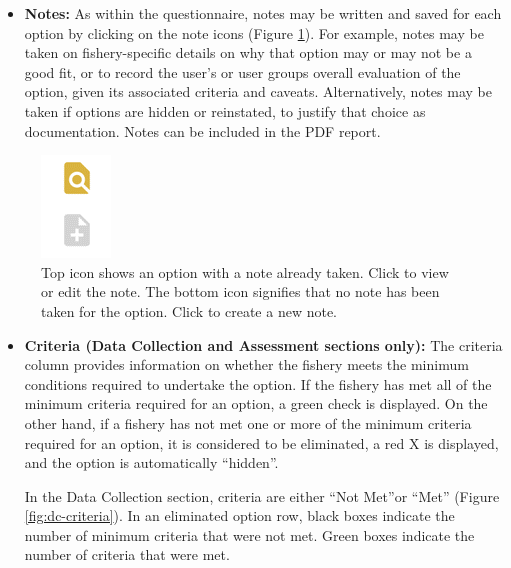 \documentclass[
  11pt,
]{book}
\providecommand{\tightlist}{%
  \setlength{\itemsep}{0pt}\setlength{\parskip}{0pt}}
\begin{document}
\begin{itemize}
\tightlist
\item
  \textbf{Notes:} As within the questionnaire, notes may be written and saved for each option by clicking on the note icons (Figure \ref{fig:notes}). For example, notes may be taken on fishery-specific details on why that option may or may not be a good fit, or to record the user's or user groups overall evaluation of the option, given its associated criteria and caveats. Alternatively, notes may be taken if options are hidden or reinstated, to justify that choice as documentation. Notes can be included in the PDF report.
\end{itemize}

\begin{figure}

{\centering \includegraphics[width=0.15\linewidth]{images/notes} 

}

\caption{Top icon shows an option with a note already taken. Click to view or edit the note. The bottom icon signifies that no note has been taken for the option. Click to create a new note.}\label{fig:notes}
\end{figure}

\begin{itemize}
\item
  \textbf{Criteria (Data Collection and Assessment sections only):} The criteria column provides information on whether the fishery meets the minimum conditions required to undertake the option. If the fishery has met all of the minimum criteria required for an option, a green check is displayed. On the other hand, if a fishery has not met one or more of the minimum criteria required for an option, it is considered to be eliminated, a red X is displayed, and the option is automatically ``hidden''.

  In the Data Collection section, criteria are either ``Not Met''or ``Met'' (Figure \ref{fig:dc-criteria}). In an eliminated option row, black boxes indicate the number of minimum criteria that were not met. Green boxes indicate the number of criteria that were met.
\end{itemize}
\end{document}

